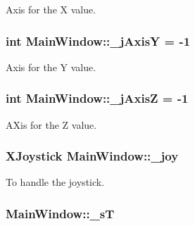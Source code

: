 Axis for the X value. 

\hypertarget{class_main_window_aaaced09ce813bbcac92047f5ef39f182}{}
\subsubsection[{\+\_\+j\+Axis\+Y}]{\setlength{\rightskip}{0pt plus 5cm}int Main\+Window\+::\+\_\+j\+Axis\+Y = -\/1\hspace{0.3cm}{\ttfamily [private]}}\label{class_main_window_aaaced09ce813bbcac92047f5ef39f182}


Axis for the Y value. 

\hypertarget{class_main_window_a18cc17eff4ff04ee0aae07c609e82d33}{}
\subsubsection[{\+\_\+j\+Axis\+Z}]{\setlength{\rightskip}{0pt plus 5cm}int Main\+Window\+::\+\_\+j\+Axis\+Z = -\/1\hspace{0.3cm}{\ttfamily [private]}}\label{class_main_window_a18cc17eff4ff04ee0aae07c609e82d33}


A\+Xis for the Z value. 

\hypertarget{class_main_window_a671f35800890e518713e1946671d8730}{}
\subsubsection[{\+\_\+joy}]{\setlength{\rightskip}{0pt plus 5cm}X\+Joystick Main\+Window\+::\+\_\+joy\hspace{0.3cm}{\ttfamily [private]}}\label{class_main_window_a671f35800890e518713e1946671d8730}


To handle the joystick. 

\hypertarget{class_main_window_a97f8ecc7ecb930b796178cef7b975013}{}
\subsubsection[{\+\_\+s\+T}]{ Main\+Window\+::\+\_\+s\+T\hspace{0.3cm}{\ttfamily [private]}}\label{class_main_window_a97f8ecc7ecb930b796178cef7b975013}


